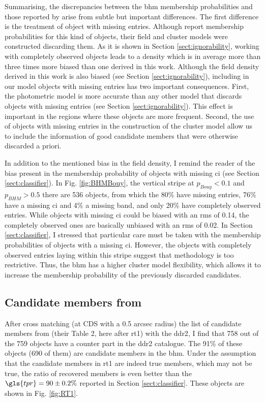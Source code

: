 Summarising, the discrepancies between the \gls{bhm} membership probabilities and those reported by \citet{Bouy2015} arise from subtle but important differences. The first difference is the treatment of object with missing entries. Although  \citet{Bouy2015} report membership probabilities for this kind of objects, their field and cluster models were constructed discarding them. As it is shown in Section \ref{sect:ignorability}, working with completely observed objects leads to a density which is in average more than three times more biased than one derived in this work. Although the field density derived in this work is also biased (see Section \ref{sect:ignorability}), including in our model objects with missing entries has two important consequences. First, the photometric model is more accurate than any other model that discards objects with missing entries (see Section  \ref{sect:ignorability}). This effect is important in the regions where these objects are more frequent. Second, the use of objects with missing entries in the construction of the cluster model allow us to include the information of good candidate members that were otherwise discarded a priori. 

In addition to the mentioned bias in the field density, I remind the reader of the bias present in the membership probability of objects with missing \gls{ci} (see Section \ref{sect:classifier}). In Fig. \ref{fig:BHMBouy}, the vertical stripe at $p_{Bouy} < 0.1$ and $p_{BHM} > 0.5$ there are 536 objects, from which the 80\% have missing entries, 76\% have a missing \gls{ci} and 4\% a missing band, and only 20\% have completely observed entries. While objects with missing \gls{ci} could be biased with an rms of 0.14, the completely observed ones are basically unbiased with an rms of 0.02. In Section   \ref{sect:classifier}, I stressed that particular care must be taken with the membership probabilities of objects with a missing \gls{ci}. However, the objects with completely observed entries laying within this stripe suggest that \citet{Bouy2015} methodology is too restrictive. Thus, the \gls{bhm} has a higher cluster model flexibility, which allows it to increase the membership probability of the previously discarded candidates.

\subsection{Candidate members from \citet{Rebull2016}}
\label{sect:comparisonRebull}

After cross matching (at CDS with a 0.5 arcsec radius) the list of candidate members from \citet{Rebull2016} (their Table 2, here after \gls{rt1}) with the  \gls{ddr2}, I find that 758 out of the 759 objects have a counter part in the \gls{ddr2} catalogue. The 91\% of these objects (690 of them) are candidate members in the \gls{bhm}. Under the assumption that the candidate members in \gls{rt1} are indeed true members, which may not be true, the ratio of recovered members is even better than the $\gls{tpr}=90\pm0.2\%$ reported in Section \ref{sect:classifier}. These objects are shown in Fig. \ref{fig:RT1}.

